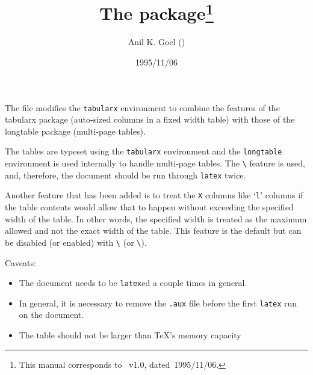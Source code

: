 \documentclass[DIV=9, parskip=half, pagesize=auto]{scrartcl}
\title{The \pkg{ltablex} package\thanks{This manual corresponds to \pkg{ltablex}~v1.0, dated~1995/11/06.}}
\author{Anil K. Goel (\mail{akgoel@uwaterloo.ca})}
\date{1995/11/06}
\makeatletter
\newcommand*{\pkg}[1]{\textsf{#1}}
\newcommand*{\cs}[1]{\texttt{\textbackslash#1}}
\newcommand*{\cmd}[1]{\cs{\expandafter\@gobble\string#1}}
\newcommand*{\env}[1]{\texttt{#1}}
\makeatother
\begin{document}
\maketitle

\noindent
The file modifies the \env{tabularx} environment to
combine the features of the \pkg{tabularx} package
(auto-sized columns in a fixed width table) 
with those of the \pkg{longtable} package 
(multi-page tables).

The tables are typeset using the \env{tabularx} environment
and the \env{longtable} environment is used internally to
handle multi-page tables. The \cmd{\setlongtables} feature
is used, and, therefore, the document should be
run through \texttt{latex} twice.

Another feature that has been added is to treat the \texttt{X}
columns like `\texttt{l}' columns if the table contents would allow
that to happen without exceeding the specified width of
the table. In other words, the specified width is 
treated as the maximum allowed and not the exact width 
of the table. This feature is the default but can be 
disabled (or enabled) with \cmd{\keepXColumns} (or \cmd{\convertXColumns}).

Caveats:
%
\begin{itemize}
\item The document needs to be \texttt{latex}ed a couple times in general.
\item In general, it is necessary to remove the \texttt{.aux} file before
  the first \texttt{latex} run on the document.
\item The table should not be larger than \TeX's memory capacity
\end{itemize}

\bigskip
\end{document}
